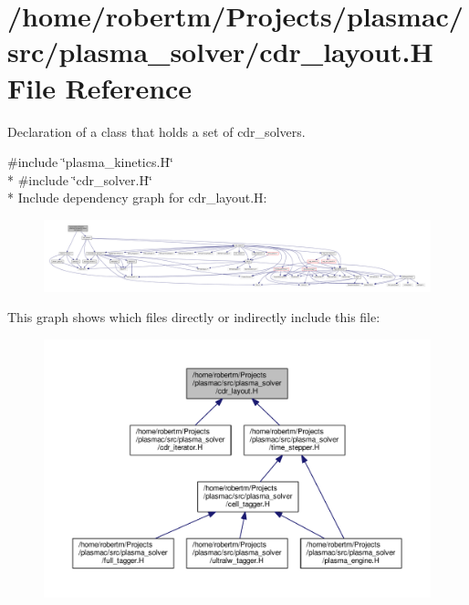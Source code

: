 \hypertarget{cdr__layout_8H}{}\section{/home/robertm/\+Projects/plasmac/src/plasma\+\_\+solver/cdr\+\_\+layout.H File Reference}
\label{cdr__layout_8H}


Declaration of a class that holds a set of cdr\+\_\+solvers.  


{\ttfamily \#include \char`\"{}plasma\+\_\+kinetics.\+H\char`\"{}}\\*
{\ttfamily \#include \char`\"{}cdr\+\_\+solver.\+H\char`\"{}}\\*
Include dependency graph for cdr\+\_\+layout.\+H\+:\nopagebreak
\begin{figure}[H]
\begin{center}
\leavevmode
\includegraphics[width=350pt]{cdr__layout_8H__incl}
\end{center}
\end{figure}
This graph shows which files directly or indirectly include this file\+:\nopagebreak
\begin{figure}[H]
\begin{center}
\leavevmode
\includegraphics[width=350pt]{cdr__layout_8H__dep__incl}
\end{center}
\end{figure}
